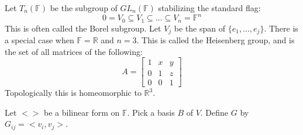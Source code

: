 \documentclass[crop=false,class=article]{standalone}                           %
\begin{document}
        \begin{example}
            Let $T_{n}(\mathbb{F})$ be the subgroup of $GL_{n}(\mathbb{F})$
            stabilizing the standard flag:
            \begin{equation}
                0=V_{0}\subseteq{V}_{1}
                \subseteq\dots\subseteq{V}_{n}=\mathbb{F}^{n}
            \end{equation}
            This is often called the Borel subgroup. Let $V_{j}$ be
            the span of $\{e_{1},\dots,e_{j}\}$. There is a special case when
            $\mathbb{F}=\mathbb{R}$ and $n=3$. This is called the
            Heisenberg group, and is the set of all matrices of the following:
            \begin{equation}
                A=\begin{bmatrix}
                    1&x&y\\
                    0&1&z\\
                    0&0&1
                \end{bmatrix}
            \end{equation}
            Topologically this is homeomorphic to $\mathbb{R}^{3}$.
        \end{example}
        Let $<>$ be a bilinear form on $\mathbb{F}$. Pick a basis $B$ of $V$.
        Define $G$ by $G_{ij}=<v_{i},v_{j}>$.
\end{document}
